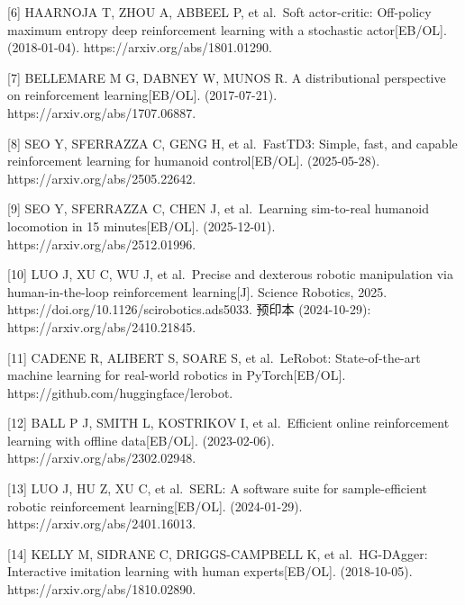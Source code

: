 \documentclass[
  chinese,
]{ctexart}
\begin{document}
{[}6{]} HAARNOJA T, ZHOU A, ABBEEL P, et al.~Soft actor-critic:
Off-policy maximum entropy deep reinforcement learning with a stochastic
actor{[}EB/OL{]}. (2018-01-04). https://arxiv.org/abs/1801.01290.

{[}7{]} BELLEMARE M G, DABNEY W, MUNOS R. A distributional perspective
on reinforcement learning{[}EB/OL{]}. (2017-07-21).
https://arxiv.org/abs/1707.06887.

{[}8{]} SEO Y, SFERRAZZA C, GENG H, et al.~FastTD3: Simple, fast, and
capable reinforcement learning for humanoid control{[}EB/OL{]}.
(2025-05-28). https://arxiv.org/abs/2505.22642.

{[}9{]} SEO Y, SFERRAZZA C, CHEN J, et al.~Learning sim-to-real humanoid
locomotion in 15 minutes{[}EB/OL{]}. (2025-12-01).
https://arxiv.org/abs/2512.01996.

{[}10{]} LUO J, XU C, WU J, et al.~Precise and dexterous robotic
manipulation via human-in-the-loop reinforcement learning{[}J{]}.
Science Robotics, 2025. https://doi.org/10.1126/scirobotics.ads5033.
预印本 (2024-10-29): https://arxiv.org/abs/2410.21845.

{[}11{]} CADENE R, ALIBERT S, SOARE S, et al.~LeRobot: State-of-the-art
machine learning for real-world robotics in PyTorch{[}EB/OL{]}.
https://github.com/huggingface/lerobot.

{[}12{]} BALL P J, SMITH L, KOSTRIKOV I, et al.~Efficient online
reinforcement learning with offline data{[}EB/OL{]}. (2023-02-06).
https://arxiv.org/abs/2302.02948.

{[}13{]} LUO J, HU Z, XU C, et al.~SERL: A software suite for
sample-efficient robotic reinforcement learning{[}EB/OL{]}.
(2024-01-29). https://arxiv.org/abs/2401.16013.

{[}14{]} KELLY M, SIDRANE C, DRIGGS-CAMPBELL K, et al.~HG-DAgger:
Interactive imitation learning with human experts{[}EB/OL{]}.
(2018-10-05). https://arxiv.org/abs/1810.02890.
\end{document}
